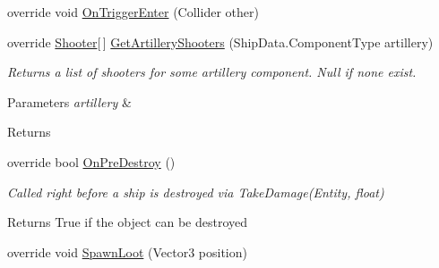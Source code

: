 \begin{DoxyCompactItemize}
\item 
\hypertarget{class_skyrates_1_1_client_1_1_entity_1_1_entity_player_ship_a6f1c770d679c0f7fdd5e48f592983386}{override void \hyperlink{class_skyrates_1_1_client_1_1_entity_1_1_entity_player_ship_a6f1c770d679c0f7fdd5e48f592983386}{On\-Trigger\-Enter} (Collider other)}\label{class_skyrates_1_1_client_1_1_entity_1_1_entity_player_ship_a6f1c770d679c0f7fdd5e48f592983386}

\item 
\hypertarget{class_skyrates_1_1_client_1_1_entity_1_1_entity_player_ship_a05f762bd1722706fcafe61c9819e3613}{override \hyperlink{class_skyrates_1_1_client_1_1_mono_1_1_shooter}{Shooter}\mbox{[}$\,$\mbox{]} \hyperlink{class_skyrates_1_1_client_1_1_entity_1_1_entity_player_ship_a05f762bd1722706fcafe61c9819e3613}{Get\-Artillery\-Shooters} (Ship\-Data.\-Component\-Type artillery)}\label{class_skyrates_1_1_client_1_1_entity_1_1_entity_player_ship_a05f762bd1722706fcafe61c9819e3613}

\begin{DoxyCompactList}\small\item\em Returns a list of shooters for some artillery component. Null if none exist. 


\begin{DoxyParams}{Parameters}
{\em artillery} & \\
\hline
\end{DoxyParams}
\begin{DoxyReturn}{Returns}

\end{DoxyReturn}
 \end{DoxyCompactList}\item 
\hypertarget{class_skyrates_1_1_client_1_1_entity_1_1_entity_player_ship_a6ccbcb23466cd4cbe04b207dce57c818}{override bool \hyperlink{class_skyrates_1_1_client_1_1_entity_1_1_entity_player_ship_a6ccbcb23466cd4cbe04b207dce57c818}{On\-Pre\-Destroy} ()}\label{class_skyrates_1_1_client_1_1_entity_1_1_entity_player_ship_a6ccbcb23466cd4cbe04b207dce57c818}

\begin{DoxyCompactList}\small\item\em Called right before a ship is destroyed via Take\-Damage(\-Entity, float) 

\begin{DoxyReturn}{Returns}
True if the object can be destroyed
\end{DoxyReturn}
 \end{DoxyCompactList}\item 
\hypertarget{class_skyrates_1_1_client_1_1_entity_1_1_entity_player_ship_a8c476f6288ed5e7c370db774323dcedf}{override void \hyperlink{class_skyrates_1_1_client_1_1_entity_1_1_entity_player_ship_a8c476f6288ed5e7c370db774323dcedf}{Spawn\-Loot} (Vector3 position)}\label{class_skyrates_1_1_client_1_1_entity_1_1_entity_player_ship_a8c476f6288ed5e7c370db774323dcedf}


\end{DoxyCompactItemize}
